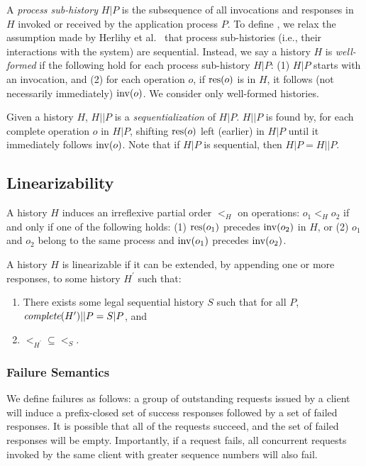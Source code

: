 A \textit{process sub-history} $H|P$ is the subsequence of all invocations and responses
in $H$ invoked or received by the application process $P$. To define \MDL{}, we relax the
assumption made by Herlihy et al.~\cite{herlihy1990linearizability} that process sub-histories
(i.e., their interactions with the system) are sequential. Instead, we say a history $H$
is \textit{well-formed} if the following hold for each process sub-history $H|P$:
(1) $H|P$ starts with an invocation, and (2) for each operation $o$, if $\operatorname{res}(o)$ is in $H$,
it follows (not necessarily immediately) $\operatorname{inv}(o)$. We consider only well-formed histories.

Given a history $H$, $H||P$ is a \textit{sequentialization} of $H|P$. $H||P$ is
found by, for each complete operation $o$ in $H|P$, shifting $\operatorname{res}(o)$ left (earlier) in $H|P$
until it immediately follows $\operatorname{inv}(o)$. Note that if $H|P$ is sequential, then $H|P = H||P$.

\subsection{\Multidispatch{} Linearizability}
\label{sec:mdl:def}

A history $H$ induces an irreflexive partial order $<_H$ on operations: $o_1 <_H o_2$ if and only if
one of the following holds: (1) $\operatorname{res}(o_1)$ precedes $\operatorname{inv}(o_2)$ in $H$, or (2) $o_1$ and $o_2$
belong to the same process and $\operatorname{inv}(o_1)$ precedes $\operatorname{inv}(o_2)$.

A history $H$ is \multidispatch{} linearizable if it can be extended, by appending one or more
responses, to some history $H^\prime$ such that:
\begin{enumerate}
    \item There exists some legal sequential history $S$ such that for all $P$,
    $\operatorname*{\textit{complete}}(H^\prime)||P = S|P$, and
    \item $<_{H^\prime} \subseteq <_S$.
\end{enumerate}

\subsubsection{Failure Semantics}

We define \mdl failures as follows: a group of outstanding requests issued by a client will induce a prefix-closed set of success responses followed by a set of failed responses. It is possible that all of the requests succeed, and the set of failed responses will be empty. Importantly, if a request fails, all concurrent requests invoked by the same client with greater sequence numbers will also fail.

